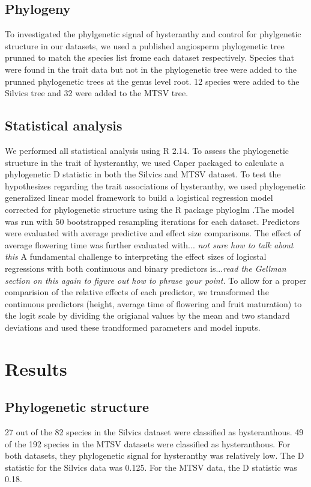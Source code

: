 \documentclass{article}\usepackage[]{graphicx}\usepackage[]{color}
\begin{document}
\subsection*{Phylogeny}
To investigated the phylgenetic signal of hysteranthy and control for phylgenetic structure in our datasets, we used a published angiosperm phylogenetic tree \citep{Zanne2014} prunned to match the species list frome each dataset respectively. Species that were found in the trait data but not in the phylogenetic tree were added to the prunned phylogenetic trees at the genus level root. 12 species were added to the Silvics tree and 32 were added to the MTSV tree.
\subsection*{Statistical analysis}
We performed all statistical analysis using R 2.14. To assess the phylogenetic structure in the trait of hysteranthy, we used Caper packaged \citep{} to calculate a phylogenetic D statistic \citep{Fritz2010} in both the Silvics and MTSV dataset. To test the hypothesizes regarding the trait associations of hysteranthy, we used phylogenetic generalized linear model framework \citep{Ives2010} to build a logistical regression model corrected for phylogenetic structure using the R package phyloglm \citep{}.The model was run with 50 bootstrapped resampling iterations for each dataset. Predictors were evaluated with average predictive and effect size comparisons. The effect of average flowering time was further evaluated with... \textit{not sure how to talk about this} A fundamental challenge to interpreting the effect sizes of logicstal regressions with both continuous and binary predictors is...\textit{read the Gellman section on this again to figure out how to phrase your point.} To allow for a proper comparision of the relative effects of each predictor, we transformed the continuous predictors (height, average time of flowering and fruit maturation) to the logit scale by dividing the origianal values by the mean and two standard deviations \citep{Gellman} and used these trandformed parameters and model inputs.
\section*{Results}
\subsection*{Phylogenetic structure}
27 out of the 82 species in the Silvics dataset were classified as hysteranthous. 49 of the 192 species in the MTSV datasets were classified as hysteranthous. For both datasets, they phylogenetic signal for hysteranthy was relatively low. The D statistic for the Silvics data was 0.125. For the MTSV data, the D statistic was 0.18.
\end{document}
